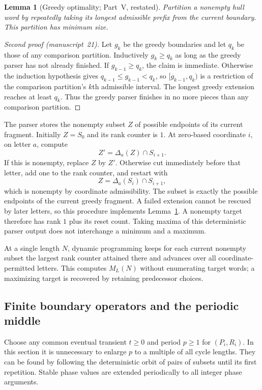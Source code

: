 \documentclass[11pt,letterpaper]{article}
\newtheorem{lemma}[theorem]{Lemma}
\theoremstyle{definition}
\theoremstyle{remark}
\begin{document}
\begin{lemma}[Greedy optimality; Part~V, restated]\label{ccc:sc:lem:greedy}
Partition a nonempty hull word by repeatedly taking its longest admissible prefix from the current boundary. This partition has minimum size.
\end{lemma}
\begin{proof}[Second proof (manuscript~21)]
Let $g_k$ be the greedy boundaries and let $q_k$ be those of any comparison partition. Inductively $g_k\ge q_k$ as long as the greedy parser has not already finished. If $g_{k-1}\ge q_k$, the claim is immediate. Otherwise the induction hypothesis gives $q_{k-1}\le g_{k-1}<q_k$, so $[g_{k-1},q_k)$ is a restriction of the comparison partition's $k$th admissible interval. The longest greedy extension reaches at least $q_k$. Thus the greedy parser finishes in no more pieces than any comparison partition.
\end{proof}

The parser stores the nonempty subset $Z$ of possible endpoints of its current fragment. Initially $Z=S_0$ and its rank counter is $1$. At zero-based coordinate $i$, on letter $a$, compute
\[
 Z'=\Delta_a(Z)\cap S_{i+1}.
\]
If this is nonempty, replace $Z$ by $Z'$. Otherwise cut immediately before that letter, add one to the rank counter, and restart with
\[
 Z=\Delta_a(S_i)\cap S_{i+1},
\]
which is nonempty by coordinate admissibility. The subset is exactly the possible endpoints of the current greedy fragment. A failed extension cannot be rescued by later letters, so this procedure implements Lemma~\ref{ccc:sc:lem:greedy}. A nonempty target therefore has rank $1$ plus its reset count. Taking maxima of this deterministic parser output does not interchange a minimum and a maximum.

At a single length $N$, dynamic programming keeps for each current nonempty subset the largest rank counter attained there and advances over all coordinate-permitted letters. This computes $M_L(N)$ without enumerating target words; a maximizing target is recovered by retaining predecessor choices.

\subsection{Finite boundary operators and the periodic middle}

Choose any common eventual transient $t\ge0$ and period $p\ge1$ for $(P_i,R_i)$. In this section it is unnecessary to enlarge $p$ to a multiple of all cycle lengths. They can be found by following the deterministic orbit of pairs of subsets until its first repetition. Stable phase values are extended periodically to all integer phase arguments.
\end{document}
